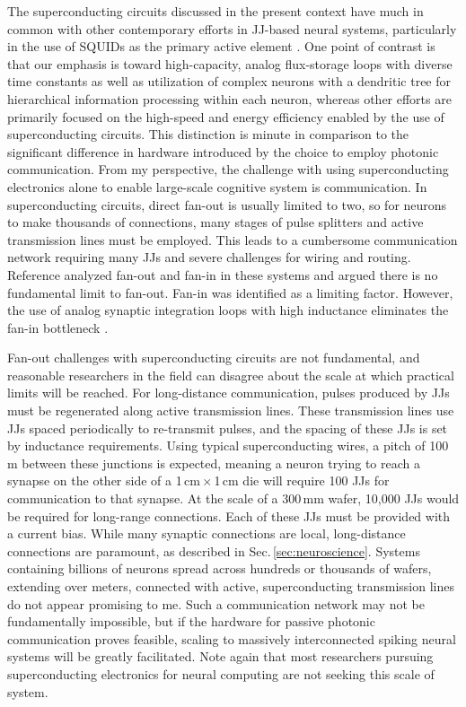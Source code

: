 \documentclass[twocolumn]{article}
\newcommand{\onlinecite}[1]{\hspace{-1 ex} \nocite{#1}\citenum{#1}}
\begin{document}
The superconducting circuits discussed in the present context have much in common with other contemporary efforts in JJ-based neural systems, particularly in the use of SQUIDs as the primary active element \cite{crsc2010,scdo2018b}. One point of contrast is that our emphasis is toward high-capacity, analog flux-storage loops with diverse time constants as well as utilization of complex neurons with a dendritic tree for hierarchical information processing within each neuron, whereas other efforts are primarily focused on the high-speed \cite{sele2017} and energy efficiency \cite{klsc2018} enabled by the use of superconducting circuits. This distinction is minute in comparison to the significant difference in hardware introduced by the choice to employ photonic communication. From my perspective, the challenge with using superconducting electronics alone to enable large-scale cognitive system is communication. In superconducting circuits, direct fan-out is usually limited to two, so for neurons to make thousands of connections, many stages of pulse splitters and active transmission lines must be employed. This leads to a cumbersome communication network requiring many JJs and severe challenges for wiring and routing. Reference \onlinecite{scse2020} analyzed fan-out and fan-in in these systems and argued there is no fundamental limit to fan-out. Fan-in was identified as a limiting factor. However, the use of analog synaptic integration loops with high inductance eliminates the fan-in bottleneck \cite{sh2019}.

Fan-out challenges with superconducting circuits are not fundamental, and reasonable researchers in the field can disagree about the scale at which practical limits will be reached. For long-distance communication, pulses produced by JJs must be regenerated along active transmission lines. These transmission lines use JJs spaced periodically to re-transmit pulses, and the spacing of these JJs is set by inductance requirements. Using typical superconducting wires, a pitch of 100\,\textmu m between these junctions is expected, meaning a neuron trying to reach a synapse on the other side of a 1\,cm\,$\times$\,1\,cm die will require 100 JJs for communication to that synapse. At the scale of a 300\,mm wafer, 10,000 JJs would be required for long-range connections. Each of these JJs must be provided with a current bias. While many synaptic connections are local, long-distance connections are paramount, as described in Sec.\,\ref{sec:neuroscience}. Systems containing billions of neurons spread across hundreds or thousands of wafers, extending over meters, connected with active, superconducting transmission lines do not appear promising to me. Such a communication network may not be fundamentally impossible, but if the hardware for passive photonic communication proves feasible, scaling to massively interconnected spiking neural systems will be greatly facilitated. Note again that most researchers pursuing superconducting electronics for neural computing are not seeking this scale of system.
\end{document}
